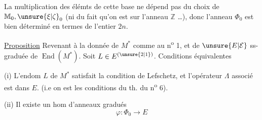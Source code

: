 La multiplication des élémts de cette base ne dépend pas du choix de $\mathbb M_0,\unsure{\xi|\zeta}_0$ (ni du fait qu'on est sur l'anneau $\mathbb Z$ \ldots), donc l'anneau $\Phi_0$ est bien déterminé en termes de l'entier  $2n$.

\uline{Proposition} Revenant à la donnée de $M^*$ comme au n\textsuperscript{o} 1, et de $\unsure{E|\mathcal E}$ ss- graduée de  $\operatorname{End}(M^*)$. Soit $L\in E^{(\unsure{2|1})}$. Conditions équivalentes

(i) L'endom $L$ de $M^*$ satisfait la condition de  Lefschetz, et l'opérateur $\Lambda$ associé est dans $E$. (i.e on est  les conditions du th. du n\textsuperscript{o} 6).

(ii) Il existe un hom d'anneaux gradués
\[
 \varphi:\Phi_0\longrightarrow E
\]
